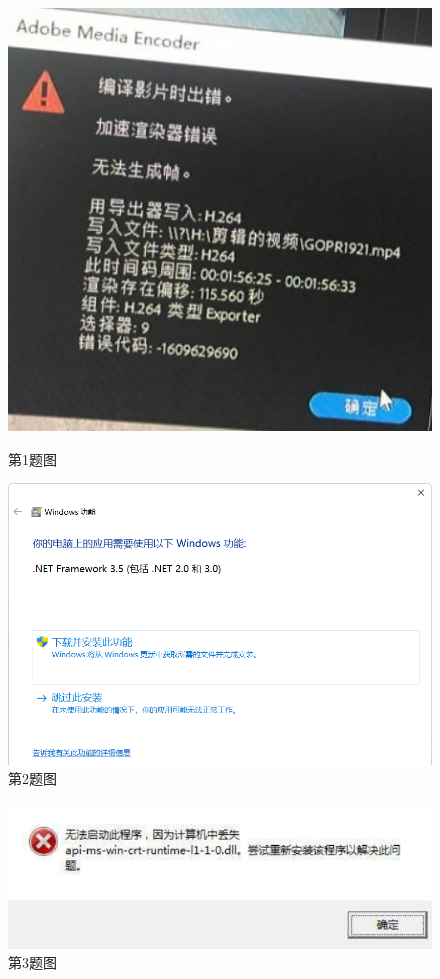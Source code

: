 \begin{figure}[htb!]
  \centering
  \begin{minipage}{.44\textwidth}
    \centering
    \includegraphics[width=.85\textwidth]{assets/basic/Encoder_error.png}
    \caption{第1题图}
    \label{fig:Encoder_error}
  \end{minipage}
  \begin{minipage}{.55\textwidth}
    \centering
    \includegraphics[width=.95\textwidth]{assets/basic/Requiring_dotNET.png}
    \caption{第2题图}
    \label{fig:Requiring_dotNET}
  \end{minipage}
\end{figure}

\begin{figure}[htb!]
  \centering
    \includegraphics[width=.6\textwidth]{assets/basic/Requiring_MSVC.png}
    \caption{第3题图}
    \label{fig:Requiring_MSVC}
\end{figure}